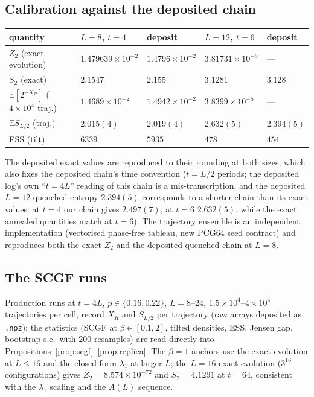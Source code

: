 \documentclass[11pt]{article}
\newcommand{\E}{\mathbb{E}}
\begin{document}
\subsection{Calibration against the deposited chain}
\begin{center}
\begin{tabular}{lllll}
\toprule
quantity & $L=8$, $t=4$ & deposit & $L=12$, $t=6$ & deposit\\
\midrule
$Z_2$ (exact evolution) & $1.479639\times10^{-2}$ & $1.4796\times10^{-2}$
  & $3.81731\times10^{-5}$ & ---\\
$\tilde S_2$ (exact) & $2.1547$ & $2.155$ & $3.1281$ & $3.128$\\
$\E[2^{-X_R}]$ ($4\times10^4$ traj.) & $1.4689\times10^{-2}$
  & $1.4942\times10^{-2}$ & $3.8399\times10^{-5}$ & ---\\
$\E S_{L/2}$ (traj.) & $2.015(4)$ & $2.019(4)$ & $2.632(5)$ & $2.394(5)$\\
ESS (tilt) & $6339$ & $5935$ & $478$ & $454$\\
\bottomrule
\end{tabular}
\end{center}
The deposited exact values are reproduced to their rounding at both sizes,
which also fixes the deposited chain's time convention ($t=L/2$ periods;
the deposited log's own ``$t=4L$'' reading of this chain is a
mis-transcription, and the deposited $L=12$ quenched entropy $2.394(5)$
corresponds to a shorter chain than its exact values: at $t=4$ our chain
gives $2.497(7)$, at $t=6$ $2.632(5)$, while the exact annealed quantities
match at $t=6$).  The trajectory ensemble is an independent implementation
(vectorised phase-free tableau, new PCG64 seed contract) and reproduces both
the exact $Z_2$ and the deposited quenched chain at $L=8$.

\subsection{The SCGF runs}
Production runs at $t=4L$, $p\in\{0.16,0.22\}$, $L=8$--$24$,
$1.5\times10^4$--$4\times10^4$ trajectories per cell, record $X_R$ and
$S_{L/2}$ per trajectory (raw arrays deposited as \texttt{.npz}); the
statistics (SCGF at $\beta\in[0.1,2]$, tilted densities, ESS, Jensen gap,
bootstrap s.e.\ with $200$ resamples) are read directly into
Propositions~\ref{prop:scgf}--\ref{prop:replica}.  The $\beta=1$ anchors
use the exact evolution at $L\le16$ and the closed-form $\lambda_1$ at
larger $L$; the $L=16$ exact evolution ($3^{16}$ configurations) gives
$Z_2=8.574\times10^{-72}$ and $\tilde S_2=4.1291$ at $t=64$, consistent
with the $\lambda_1$ scaling and the $A(L)$ sequence.
\end{document}

